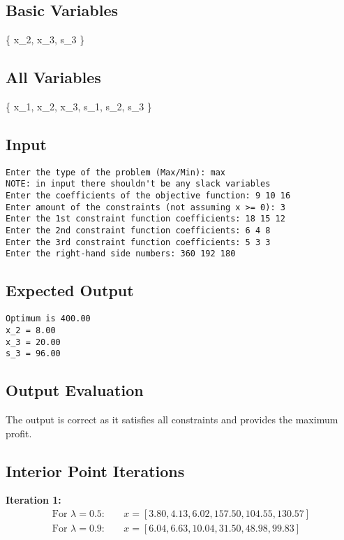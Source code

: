 \documentclass[12pt, legalpaper]{exam}
\begin{document}
\subsection*{Basic Variables}
\{ x_2, x_3, s_3 \}

\subsection*{All Variables}
\{ x_1, x_2, x_3, s_1, s_2, s_3 \}

\subsection*{Input}
\begin{verbatim}
Enter the type of the problem (Max/Min): max
NOTE: in input there shouldn't be any slack variables
Enter the coefficients of the objective function: 9 10 16
Enter amount of the constraints (not assuming x >= 0): 3
Enter the 1st constraint function coefficients: 18 15 12
Enter the 2nd constraint function coefficients: 6 4 8
Enter the 3rd constraint function coefficients: 5 3 3
Enter the right-hand side numbers: 360 192 180
\end{verbatim}

\subsection*{Expected Output}
\begin{verbatim}
Optimum is 400.00
x_2 = 8.00
x_3 = 20.00
s_3 = 96.00
\end{verbatim}

\subsection*{Output Evaluation}
The output is correct as it satisfies all constraints and provides the maximum profit.

\subsection*{Interior Point Iterations}

\textbf{Iteration 1:}
\begin{align*}
    \text{For } \lambda = 0.5: & \quad x = [ 3.80, 4.13, 6.02, 157.50, 104.55, 130.57 ] \\
    \text{For } \lambda = 0.9: & \quad x = [ 6.04, 6.63, 10.04, 31.50, 48.98, 99.83 ]
\end{align*}
\end{document}
